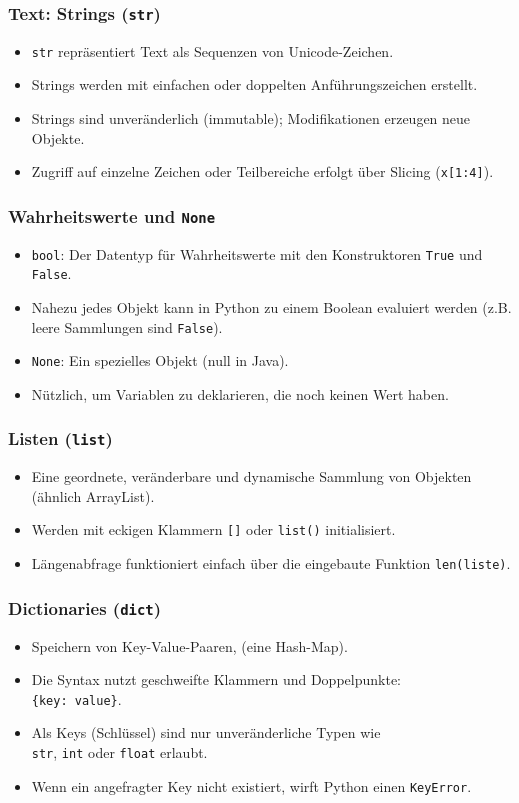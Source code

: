\begin{frame}
  \frametitle{Text: Strings (\texttt{str})}
  \begin{itemize}[<+->]
  \item \texttt{str} repräsentiert Text als Sequenzen von Unicode-Zeichen.
  \item Strings werden mit einfachen oder doppelten Anführungszeichen erstellt.
  \item Strings sind unveränderlich (immutable); Modifikationen erzeugen neue Objekte.
  \item Zugriff auf einzelne Zeichen oder Teilbereiche erfolgt über Slicing (\texttt{x[1:4]}).
  \end{itemize}
\end{frame}

\begin{frame}
  \frametitle{Wahrheitswerte und \texttt{None}}
  \begin{itemize}[<+->]
  \item \texttt{bool}: Der Datentyp für Wahrheitswerte mit den Konstruktoren \texttt{True} und \texttt{False}.
  \item Nahezu jedes Objekt kann in Python zu einem Boolean evaluiert werden (z.B. leere Sammlungen sind \texttt{False}).
  \item \texttt{None}: Ein spezielles Objekt (null in Java).
  \item Nützlich, um Variablen zu deklarieren, die noch keinen Wert haben.
  \end{itemize}
\end{frame}

\begin{frame}
  \frametitle{Listen (\texttt{list})}
  \begin{itemize}[<+->]
  \item Eine geordnete, veränderbare und dynamische Sammlung von Objekten (ähnlich ArrayList).
  \item Werden mit eckigen Klammern \texttt{[]} oder \texttt{list()} initialisiert.
  \item Längenabfrage funktioniert einfach über die eingebaute Funktion \texttt{len(liste)}.
  \end{itemize}
\end{frame}

\begin{frame}
  \frametitle{Dictionaries (\texttt{dict})}
  \begin{itemize}[<+->]
  \item Speichern von Key-Value-Paaren, (eine Hash-Map).
  \item Die Syntax nutzt geschweifte Klammern und Doppelpunkte:\\
    \texttt{\{\dq key\dq: \dq value\dq\}}.
  \item Als Keys (Schlüssel) sind nur unveränderliche Typen wie\\ \texttt{str}, \texttt{int} oder \texttt{float} erlaubt.
  \item Wenn ein angefragter Key nicht existiert, wirft Python einen \texttt{KeyError}.
  \end{itemize}
\end{frame}

